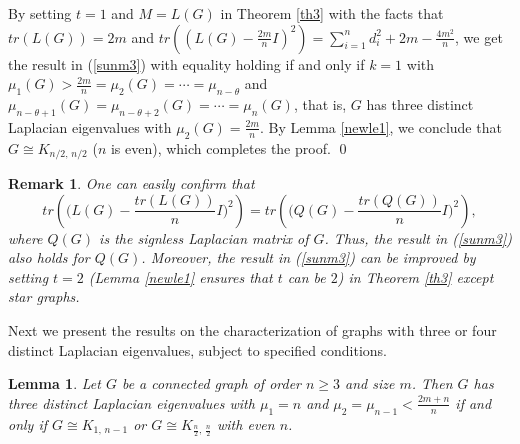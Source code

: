 \documentclass[12pt]{article}
\newtheorem{lemma}[theorem]{Lemma}
\newtheorem{remark}[theorem]{Remark}
\newenvironment{pf}{\medskip\noindent{Proof:  \hspace*{-.4cm}}
       \enspace}{\hfill \qed \newline \medskip}
\begin{document}
 \begin{pf}
 By setting $t=1$ and $M=L(G)$ in Theorem \ref{th3} with the facts that
 $tr(L(G))=2m$ and $tr((L(G)-\frac{2m}{n}I)^2)=\sum_{i=1}^{n}d_i^2+2m-
 \frac{4m^2}{n}$, we get the result in (\ref{sunm3}) with equality holding if and only if $k=1$ with $\mu_1(G)>\frac{2m}{n}=\mu_2(G)=\cdots=\mu_{n-\theta}$ and
 $\mu_{n-\theta+1}(G)=\mu_{n-\theta+2}(G)=\cdots=\mu_n(G)$, that is, $G$ has three distinct
 Laplacian eigenvalues with $\mu_2(G)=\frac{2m}{n}$.
 By Lemma \ref{newle1}, we conclude that $G\cong K_{n/2,\,n/2}$ ($n$ is even), which completes the proof.
 \end{pf}

 \begin{remark} {\rm One can easily confirm that  
 $$tr\left(\Big(L(G)-\frac{tr(L(G))}{n}I\Big)^2\right)=tr\left(\Big(Q(G)-\frac{tr(Q(G))}{n}I\Big)^2\right),$$ 
 where $Q(G)$ is the signless Laplacian matrix of $G$. Thus, the result in (\ref{sunm3}) also holds for $Q(G)$. Moreover, the result in (\ref{sunm3}) can be improved by setting $t=2$ (Lemma \ref{newle1} ensures that $t$ can be $2$) in Theorem \ref{th3} except star graphs.}
 \end{remark}

Next we present the results on the characterization of graphs with three or four distinct Laplacian eigenvalues, subject to specified conditions.
\begin{lemma} \label{nlesundas1}
    Let $G$ be a connected graph of order $n\geq 3$ and size $m$. Then $G$ has three distinct Laplacian eigenvalues with $\mu_1=n$ and $\mu_2=\mu_{n-1}<\frac{2m+n}{n}$
    if and only if
    $G\cong K_{1,\,n-1}$ or $G\cong K_{\frac{n}{2},\,\frac{n}{2}}$ with even $n$.
    \end{lemma}
    
\end{document}
